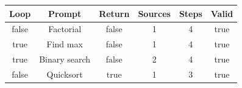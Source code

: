 \begin{table}[h]
\centering
\begin{tabular}{ |c|c|c|c|c|c| }
\hline
Loop & Prompt & Return & Sources & Steps & Valid \\
\hline
false & Factorial & false & 1 & 4 & true \\
\hline
true & Find max & false & 1 & 4 & true \\
\hline
true & Binary search & false & 2 & 4 & true \\
\hline
false & Quicksort & true & 1 & 3 & true \\
\hline
\end{tabular}
\end{table}
